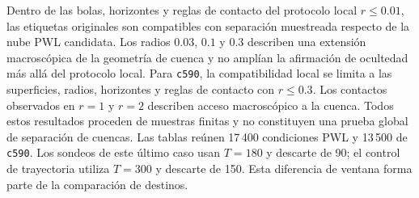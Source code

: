 Dentro de las bolas, horizontes y reglas de contacto del protocolo local
\(r\leq0.01\), las etiquetas originales son compatibles con separación
muestreada respecto de la nube PWL candidata. Los radios \(0.03\), \(0.1\) y \(0.3\) describen una
extensión macroscópica de la geometría de cuenca y no amplían la afirmación de
ocultedad más allá del protocolo local. Para \texttt{c590}, la compatibilidad
local se limita a las superficies, radios, horizontes y reglas de contacto con
\(r\leq0.3\). Los contactos observados en \(r=1\) y \(r=2\) describen acceso
macroscópico a la cuenca. Todos estos resultados proceden de muestras finitas
y no constituyen una prueba global de separación de cuencas.
Las tablas reúnen 17\,400 condiciones PWL y 13\,500 de \texttt{c590}.
Los sondeos de este último caso usan \(T=180\) y descarte de 90; el
control de trayectoria utiliza \(T=300\) y descarte de 150. Esta diferencia
de ventana forma parte de la comparación de destinos.
\fi
